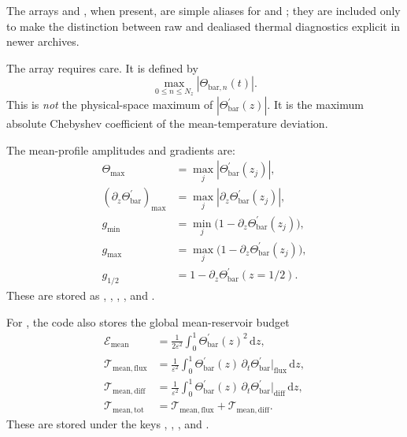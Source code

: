 \documentclass[11pt]{article}
\newcommand{\dd}{\mathrm{d}}
\begin{document}
The arrays  and , when present, are
simple aliases for  and ; they are included only
to make the distinction between raw and dealiased thermal diagnostics explicit
in newer archives.

The array  requires care. It is defined by
\[
\max_{0\le n\le N_z} |\Theta_{\mathrm{bar},n}(t)|.
\]
This is \emph{not} the physical-space maximum of
\(|\Theta_{\mathrm{bar}}^{\prime}(z)|\). It is the maximum absolute Chebyshev
coefficient of the mean-temperature deviation.

The mean-profile amplitudes and gradients are:
\begin{align*}
\Theta_{\max}
&=
\max_j |\Theta_{\mathrm{bar}}^{\prime}(z_j)|,\\
(\partial_z \Theta_{\mathrm{bar}}^{\prime})_{\max}
&=
\max_j |\partial_z \Theta_{\mathrm{bar}}^{\prime}(z_j)|,\\
g_{\min}
&=
\min_j \bigl(1 - \partial_z \Theta_{\mathrm{bar}}^{\prime}(z_j)\bigr),\\
g_{\max}
&=
\max_j \bigl(1 - \partial_z \Theta_{\mathrm{bar}}^{\prime}(z_j)\bigr),\\
g_{1/2}
&=
1 - \partial_z \Theta_{\mathrm{bar}}^{\prime}(z=1/2).
\end{align*}
These are stored as , ,
, , and .

For , the code also stores the global
mean-reservoir budget
\begin{align*}
\mathcal{E}_{\mathrm{mean}}
&=
\frac{1}{2\varepsilon^2}\int_0^1 \Theta_{\mathrm{bar}}^{\prime}(z)^2\,\dd z,\\
\mathcal{T}_{\mathrm{mean,flux}}
&=
\frac{1}{\varepsilon^2}\int_0^1
\Theta_{\mathrm{bar}}^{\prime}(z)\,
\partial_t\Theta_{\mathrm{bar}}^{\prime}\big|_{\mathrm{flux}}\,\dd z,\\
\mathcal{T}_{\mathrm{mean,diff}}
&=
\frac{1}{\varepsilon^2}\int_0^1
\Theta_{\mathrm{bar}}^{\prime}(z)\,
\partial_t\Theta_{\mathrm{bar}}^{\prime}\big|_{\mathrm{diff}}\,\dd z,\\
\mathcal{T}_{\mathrm{mean,tot}}
&=
\mathcal{T}_{\mathrm{mean,flux}}
+
\mathcal{T}_{\mathrm{mean,diff}}.
\end{align*}
These are stored under the keys ,
, , and
.
\end{document}
